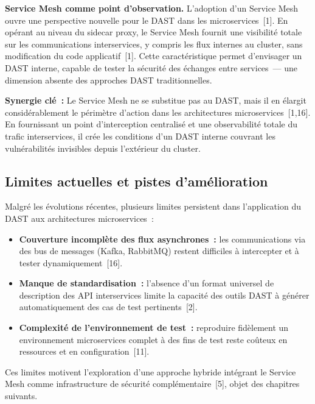\medskip
\textbf{Service Mesh comme point d'observation.} L'adoption d'un Service Mesh
ouvre une perspective nouvelle pour le DAST dans les microservices~[1]. En
opérant au niveau du sidecar proxy, le Service Mesh fournit une visibilité
totale sur les communications interservices, y compris les flux internes au
cluster, sans modification du code applicatif~[1]. Cette caractéristique permet
d'envisager un DAST interne, capable de tester la sécurité des échanges entre
services~--- une dimension absente des approches DAST traditionnelles.

\medskip\noindent
\textbf{Synergie clé~:} Le Service Mesh ne se substitue pas au DAST, mais il
en élargit considérablement le périmètre d'action dans les architectures
microservices~[1,16]. En fournissant un point d'interception centralisé et une
observabilité totale du trafic interservices, il crée les conditions d'un DAST
interne couvrant les vulnérabilités invisibles depuis l'extérieur du cluster.

\subsection{Limites actuelles et pistes d'amélioration}

Malgré les évolutions récentes, plusieurs limites persistent dans l'application
du DAST aux architectures microservices~:

\begin{itemize}[leftmargin=*, topsep=2pt, itemsep=3pt]
  \item \textbf{Couverture incomplète des flux asynchrones~:} les communications
    via des bus de messages (Kafka, RabbitMQ) restent difficiles à intercepter
    et à tester dynamiquement~[16].
  \item \textbf{Manque de standardisation~:} l'absence d'un format universel de
    description des API interservices limite la capacité des outils DAST à
    générer automatiquement des cas de test pertinents~[2].
  \item \textbf{Complexité de l'environnement de test~:} reproduire fidèlement
    un environnement microservices complet à des fins de test reste coûteux en
    ressources et en configuration~[11].
\end{itemize}

Ces limites motivent l'exploration d'une approche hybride intégrant le Service
Mesh comme infrastructure de sécurité complémentaire~[5], objet des chapitres
suivants.

